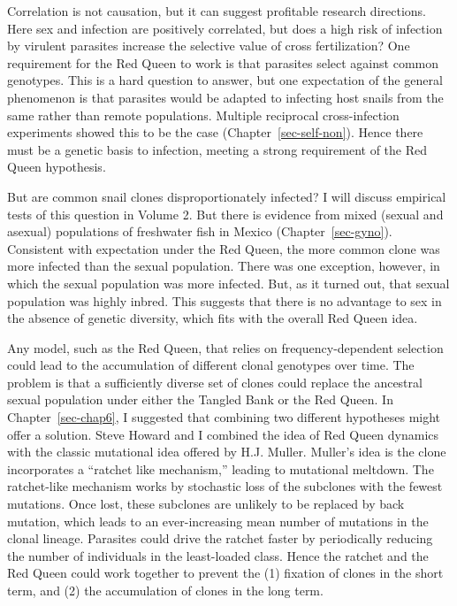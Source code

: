\documentclass[
  american,
  letterpaper,
]{book}
\begin{document}
Correlation is not causation, but it can suggest profitable research
directions. Here sex and infection are positively correlated, but does a
high risk of infection by virulent parasites increase the selective
value of cross fertilization? One requirement for the Red Queen to work
is that parasites select against common genotypes. This is a hard
question to answer, but one expectation of the general phenomenon is
that parasites would be adapted to infecting host snails from the same
rather than remote populations. Multiple reciprocal cross-infection
experiments showed this to be the case (Chapter~\ref{sec-self-non}).
Hence there must be a genetic basis to infection, meeting a strong
requirement of the Red Queen hypothesis.

But are common snail clones disproportionately infected? I will discuss
empirical tests of this question in Volume 2. But there is evidence from
mixed (sexual and asexual) populations of freshwater fish in Mexico
(Chapter~\ref{sec-gyno}). Consistent with expectation under the Red
Queen, the more common clone was more infected than the sexual
population. There was one exception, however, in which the sexual
population was more infected. But, as it turned out, that sexual
population was highly inbred. This suggests that there is no advantage
to sex in the absence of genetic diversity, which fits with the overall
Red Queen idea.

Any model, such as the Red Queen, that relies on frequency-dependent
selection could lead to the accumulation of different clonal genotypes
over time. The problem is that a sufficiently diverse set of clones
could replace the ancestral sexual population under either the Tangled
Bank or the Red Queen. In Chapter~\ref{sec-chap6}, I suggested that
combining two different hypotheses might offer a solution. Steve Howard
and I combined the idea of Red Queen dynamics with the classic
mutational idea offered by H.J. Muller. Muller's idea is the clone
incorporates a ``ratchet like mechanism,'' leading to mutational
meltdown. The ratchet-like mechanism works by stochastic loss of the
subclones with the fewest mutations. Once lost, these subclones are
unlikely to be replaced by back mutation, which leads to an
ever-increasing mean number of mutations in the clonal lineage.
Parasites could drive the ratchet faster by periodically reducing the
number of individuals in the least-loaded class. Hence the ratchet and
the Red Queen could work together to prevent the (1) fixation of clones
in the short term, and (2) the accumulation of clones in the long term.
\end{document}
